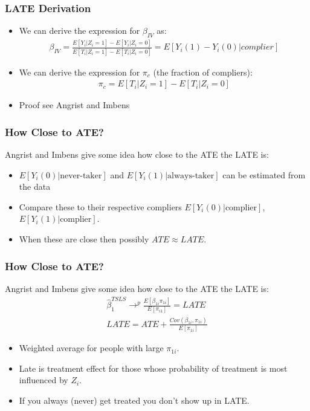 \begin{frame}
\frametitle{LATE Derivation}
\begin{itemize}
\item We can derive the expression for $\beta_{IV}$ as:
\begin{eqnarray*}
\beta_{IV} = \frac{E[Y_i  | Z_i = 1] - E[Y_i | Z_i = 0] }{E[T_i | Z_i=1 ] - E[T_i | Z_i = 0]} = E[Y_i(1) - Y_i(0) | complier]
\end{eqnarray*}
\item We can derive the expression for $\pi_c$ (the fraction of compliers):
\begin{eqnarray*}
\pi_c = E[T_i | Z_i = 1] - E[T_i | Z_i =0] 
\end{eqnarray*}
\item Proof see Angrist and Imbens
\end{itemize}
\end{frame}

\begin{frame}
\frametitle{How Close to ATE?}
Angrist and Imbens give some idea how close to the ATE the LATE is:
\begin{itemize}
\item $E[Y_i(0) | \text{never-taker}]$ and  $E[Y_i(1) | \text{always-taker}]$ can be estimated from the data
\item Compare these to their respective compliers $E[Y_i(0) | \text{complier}]$, $E[Y_i(1) | \text{complier}]$.
\item When these are close then possibly $ATE \approx LATE$.
\end{itemize}
\end{frame}

\begin{frame}
\frametitle{How Close to ATE?}
Angrist and Imbens give some idea how close to the ATE the LATE is:
\begin{eqnarray*}
\widehat{\beta}_1^{TSLS} \rightarrow^p \frac{E[\beta_{1i} \pi_{1i}]}{E[\pi_{i1}]} = LATE \\
LATE = ATE + \frac{Cov(\beta_{1i},\pi_{1i})}{E[\pi_{1i}]}
\end{eqnarray*}
\begin{itemize}
\item Weighted average for people with large $\pi_{1i}$.
\item Late is treatment effect for those whose probability of treatment is most influenced by $Z_i$.
\item If you always (never) get treated you don't show up in LATE.
\end{itemize}
\end{frame}


